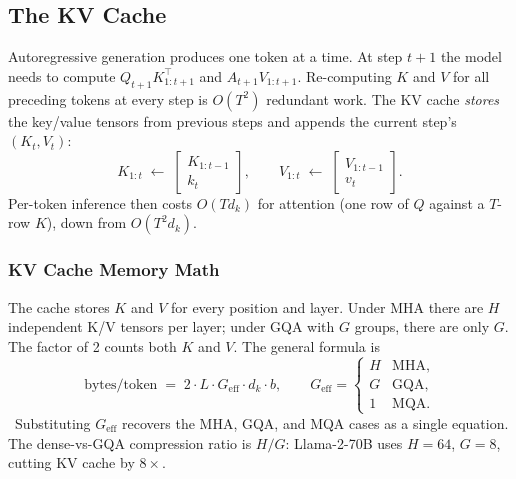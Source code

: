 \subsection{The KV Cache}

Autoregressive generation produces one token at a time. At step $t+1$
the model needs to compute $Q_{t+1} K_{1:t+1}^{\top}$ and
$A_{t+1} V_{1:t+1}$. Re-computing $K$ and $V$ for all preceding
tokens at every step is $O(T^2)$ redundant work. The KV cache
\emph{stores} the key/value tensors from previous steps and appends
the current step's $(K_t, V_t)$:
\begin{equation}
\label{eq:week4-kvcache}
K_{1:t} \;\leftarrow\; \begin{bmatrix} K_{1:t-1} \\ k_t \end{bmatrix},
\qquad
V_{1:t} \;\leftarrow\; \begin{bmatrix} V_{1:t-1} \\ v_t \end{bmatrix}.
\end{equation}
Per-token inference then costs $O(T d_k)$ for attention (one row of
$Q$ against a $T$-row $K$), down from $O(T^2 d_k)$.

\subsubsection{KV Cache Memory Math}

The cache stores $K$ and $V$ for every position and layer. Under
MHA there are $H$ independent K/V tensors per layer; under GQA with
$G$ groups, there are only $G$. The factor of 2 counts both $K$ and
$V$. The general formula is
\begin{equation}
\label{eq:week4-kvbytes}
\text{bytes/token}
\;=\; 2 \cdot L \cdot G_{\mathrm{eff}} \cdot d_k \cdot b,
\qquad
G_{\mathrm{eff}} = \begin{cases}
H & \text{MHA}, \\
G & \text{GQA}, \\
1 & \text{MQA}.
\end{cases}
\end{equation}
\Ident\ Substituting $G_{\mathrm{eff}}$ recovers the MHA, GQA, and MQA
cases as a single equation. The dense-vs-GQA compression ratio is
$H/G$: Llama-2-70B uses $H=64$, $G=8$, cutting KV cache by $8\times$.

